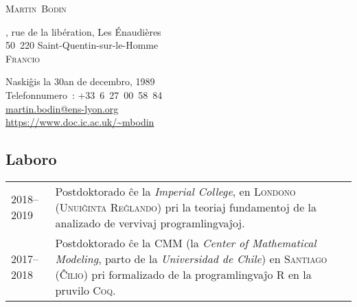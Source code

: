 \documentclass[12pt,a4paper]{article}
\makeatletter
\newcommand{\en}[1]{\foreignlanguage{english}{\textit{#1}}}
\newcommand{\es}[1]{\foreignlanguage{spanish}{\textit{#1}}}
\newenvironment{datecvsection}[1]%
               {\subsection*{#1}%
                 \noindent \begin{tabular}{@{}p{\annee}p{\texte}@{}}}
               {\end{tabular}}
\makeatother
\begin{document}
\pagestyle{empty}


\newlength{\annee}
\settowidth{\annee}{9999--9999}


\newlength{\texte}
\setlength{\texte}{\textwidth} \addtolength{\texte}{-\annee} 
	\addtolength{\texte}{-2\tabcolsep}

\begin{center} \Huge \textsc{Martin~Bodin} \end{center}

\parbox[c]{.5\textwidth}
{
  , rue de la libération,
  Les Énaudières \\
  50~220 Saint-Quentin-sur-le-Homme \\
  \textsc{Francio}
}
\parbox[c]{.55\textwidth}
{
\begin{flushright}
  Naskiĝis la 30an de decembro, 1989 \\
  \noindent Telefonnumero~: \mbox{+33 6 27 00 58 84} \\
  \url{martin.bodin@ens-lyon.org} \\
  \url{https://www.doc.ic.ac.uk/~mbodin}
\end{flushright}
}


\begin{datecvsection}{Laboro}

    2018–2019 & Postdoktorado ĉe la \en{Imperial College}, en \textsc{Londono} (\textsc{Unuiĝinta Reĝlando}) pri la teoriaj fundamentoj de la analizado de vervivaj programlingvaĵoj. \\

    2017–2018 & Postdoktorado ĉe la \textsc{CMM} (la \en{Center of Mathematical Modeling}, parto de la \es{Universidad de Chile}) en \textsc{Santiago} (\textsc{Ĉilio}) pri formalizado de la programlingvaĵo \textsc{R} en la pruvilo \textsc{Coq}. \\

\end{datecvsection}
\end{document}
